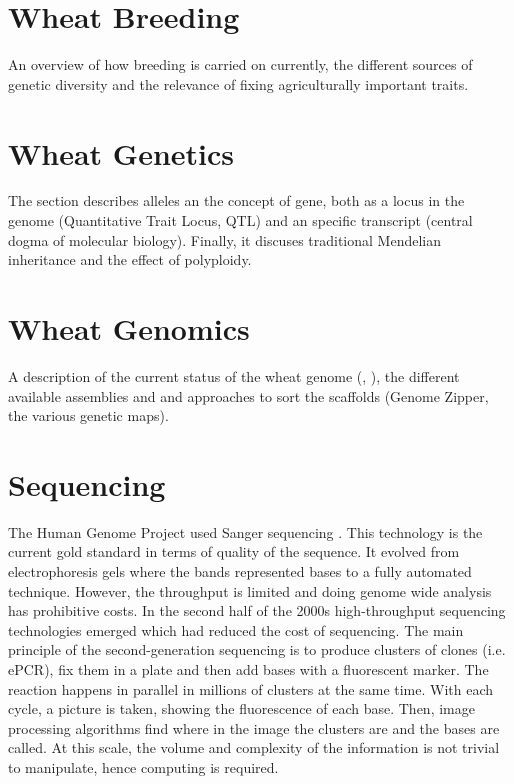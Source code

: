 

\section{Wheat Breeding}
An overview of how breeding is carried on currently, the different sources of genetic diversity and the relevance of fixing agriculturally important traits. 
\section{Wheat Genetics}
The section describes alleles an the concept of gene, both as a locus in the genome (Quantitative Trait Locus, QTL) and an specific transcript (central dogma of molecular biology). Finally, it discuses traditional Mendelian inheritance and the effect of polyploidy.  
\section{Wheat Genomics}
A description of the current status of the wheat genome (\citet{Mayer2014}, \citet{Chapman2015}), the different available assemblies and and approaches to sort the scaffolds (Genome Zipper, the various genetic maps).  
\section{Sequencing} 



The Human Genome Project used Sanger sequencing \cite{Lander2001}. This technology is the current gold standard in terms of quality of the sequence. It evolved from electrophoresis gels where the bands represented bases to a fully automated technique. However, the throughput is limited and doing genome wide analysis has prohibitive costs. In the second half of the 2000s high-throughput sequencing technologies emerged which had reduced the cost of sequencing. The main principle of the second-generation sequencing is to produce clusters of clones (i.e. ePCR), fix them in a plate and then add bases with a fluorescent marker. The reaction happens in parallel in millions of clusters at the same time. With each cycle, a picture is taken, showing the fluorescence of each base. Then, image processing algorithms find where in the image the clusters are and the bases are called. At this scale, the volume and complexity of the information is not trivial to manipulate, hence computing is required. 


